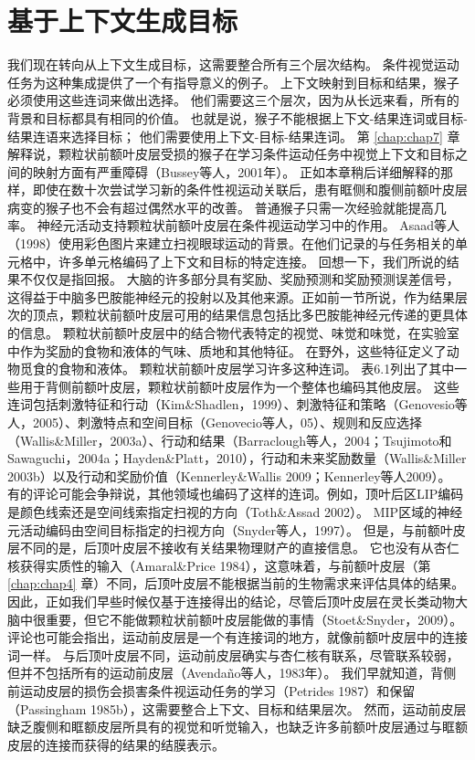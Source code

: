 \section{基于上下文生成目标}

我们现在转向从上下文生成目标，这需要整合所有三个层次结构。
条件视觉运动任务为这种集成提供了一个有指导意义的例子。
上下文映射到目标和结果，猴子必须使用这些连词来做出选择。
他们需要这三个层次，因为从长远来看，所有的背景和目标都具有相同的价值。
也就是说，猴子不能根据上下文-结果连词或目标-结果连语来选择目标；
他们需要使用上下文-目标-结果连词。
第 \ref{chap:chap7} 章解释说，颗粒状前额叶皮层受损的猴子在学习条件运动任务中视觉上下文和目标之间的映射方面有严重障碍（Bussey等人，2001年）。
正如本章稍后详细解释的那样，即使在数十次尝试学习新的条件性视运动关联后，患有眶侧和腹侧前额叶皮层病变的猴子也不会有超过偶然水平的改善。
普通猴子只需一次经验就能提高几率。
神经元活动支持颗粒状前额叶皮层在条件视运动学习中的作用。
Asaad等人（1998）使用彩色图片来建立扫视眼球运动的背景。在他们记录的与任务相关的单元格中，许多单元格编码了上下文和目标的特定连接。
回想一下，我们所说的结果不仅仅是指回报。
大脑的许多部分具有奖励、奖励预测和奖励预测误差信号，这得益于中脑多巴胺能神经元的投射以及其他来源。正如前一节所说，作为结果层次的顶点，颗粒状前额叶皮层可用的结果信息包括比多巴胺能神经元传递的更具体的信息。
颗粒状前额叶皮层中的结合物代表特定的视觉、味觉和味觉，在实验室中作为奖励的食物和液体的气味、质地和其他特征。
在野外，这些特征定义了动物觅食的食物和液体。
颗粒状前额叶皮层学习许多这种连词。
表6.1列出了其中一些用于背侧前额叶皮层，颗粒状前额叶皮层作为一个整体也编码其他皮层。
这些连词包括刺激特征和行动（Kim\&Shadlen，1999）、刺激特征和策略（Genovesio等人，2005）、刺激特点和空间目标（Genovecio等人，05）、规则和反应选择（Wallis\&Miller，2003a）、行动和结果（Barraclough等人，2004；Tsujimoto和Sawaguchi，2004a；Hayden\&Platt，2010），行动和未来奖励数量（Wallis\&Miller 2003b）以及行动和奖励价值（Kennerley\&Wallis 2009；Kennerley等人2009）。
有的评论可能会争辩说，其他领域也编码了这样的连词。例如，顶叶后区LIP编码是颜色线索还是空间线索指定扫视的方向（Toth\&Assad 2002）。
MIP区域的神经元活动编码由空间目标指定的扫视方向（Snyder等人，1997）。
但是，与前额叶皮层不同的是，后顶叶皮层不接收有关结果物理财产的直接信息。
它也没有从杏仁核获得实质性的输入（Amaral\&Price 1984），这意味着，与前额叶皮层（第 \ref{chap:chap4} 章）不同，后顶叶皮层不能根据当前的生物需求来评估具体的结果。
因此，正如我们早些时候仅基于连接得出的结论，尽管后顶叶皮层在灵长类动物大脑中很重要，但它不能做颗粒状前额叶皮层能做的事情（Stoet\&Snyder，2009）。
评论也可能会指出，运动前皮层是一个有连接词的地方，就像前额叶皮层中的连接词一样。
与后顶叶皮层不同，运动前皮层确实与杏仁核有联系，尽管联系较弱，但并不包括所有的运动前皮层（Avendaño等人，1983年）。
我们早就知道，背侧前运动皮层的损伤会损害条件视运动任务的学习（Petrides 1987）和保留（Passingham 1985b），这需要整合上下文、目标和结果层次。
然而，运动前皮层缺乏腹侧和眶额皮层所具有的视觉和听觉输入，也缺乏许多前额叶皮层通过与眶额皮层的连接而获得的结果的结膜表示。


